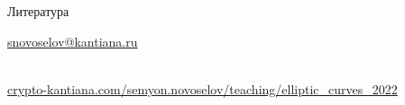 \documentclass{beamer}
\begin{document}

\begin{frame}{Литература}
    \nocite{CohenFrey+2005}
    \nocite{Washington2008}
    \printbibliography
    
    \begin{center}
        \begin{tcolorbox}[enhanced,hbox,colback=block-green-color-bg,colframe=subsection-color!120,title=Контакты,center title]
            \begin{varwidth}{\textwidth}
                \begin{center}
                    \href{mailto:snovoselov@kantiana.ru}{snovoselov@kantiana.ru}
                \end{center}
            \end{varwidth}
        \end{tcolorbox}	
    \end{center}

\\
{\footnotesize
    \href{https://crypto-kantiana.com/semyon.novoselov/teaching/elliptic_curves_2021}{crypto-kantiana.com/semyon.novoselov/teaching/elliptic\_curves\_2022}
}
\end{frame}
\end{document}
